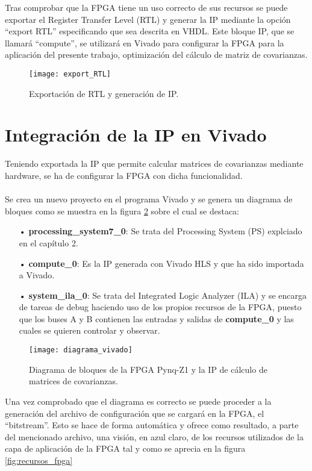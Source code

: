 Tras comprobar que la FPGA tiene un uso correcto de sus recursos se puede exportar el Register Transfer Level (RTL) y generar la IP mediante la opción ``export RTL'' especificando que sea descrita en VHDL. Este bloque IP, que se llamará ``compute'', se utilizará en Vivado para configurar la FPGA para la aplicación del presente trabajo, optimización del cálculo de matriz de covarianzas.

\begin{figure}
\centering
\texttt{[image: export\_RTL]}
\caption{Exportación de RTL y generación de IP.}\label{fig:export_RTL}
\end{figure}

\section{Integración de la IP en Vivado}
Teniendo exportada la IP que permite calcular matrices de covarianzas mediante hardware, se ha de configurar la FPGA con dicha funcionalidad.
\\
\\
Se crea un nuevo proyecto en el programa Vivado y se genera un diagrama de bloques como se muestra en la figura \ref{fig:diagrama_vivado} sobre el cual se destaca:
\begin{itemize}
\item[•] \textbf{processing\_system7\_0}: Se trata del Processing System (PS) explciado en el capítulo 2.
\item[•] \textbf{compute\_0}: Es la IP generada con Vivado HLS y que ha sido importada a Vivado.
\item[•] \textbf{system\_ila\_0}: Se trata del Integrated Logic Analyzer (ILA) y se encarga de tareas de debug haciendo uso de los propios recursos de la FPGA, puesto que los buses A y B contienen las entradas y salidas de \textbf{compute\_0} y las cuales se quieren controlar y observar.
\end{itemize}


\begin{figure}
\centering
\texttt{[image: diagrama\_vivado]}
\caption{Diagrama de bloques de la FPGA Pynq-Z1 y la IP de cálculo de matrices de covarianzas.}\label{fig:diagrama_vivado}
\end{figure}

Una vez comprobado que el diagrama es correcto se puede proceder a la generación del archivo de configuración que se cargará en la FPGA, el ``bitstream''. Esto se hace de forma automática y ofrece como resultado, a parte del mencionado archivo, una visión, en azul claro, de los recursos utilizados de la capa de aplicación de la FPGA tal y como se aprecia en la figura \ref{fig:recursos_fpga}

